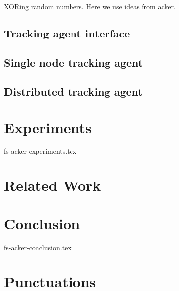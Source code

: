 \documentclass{vldb}
\begin{document}
XORing random numbers. Here we use ideas from acker.

\subsection{Tracking agent interface}

\subsection{Single node tracking agent}

\subsection{Distributed tracking agent}





\section {Experiments}
 {fs-acker-experiments.tex}

\section{Related Work}

\section {Conclusion}
 {fs-acker-conclusion.tex}

\appendix 
\section {Punctuations} \label{appendix:punctuations-proof}


% 

\end{document}
